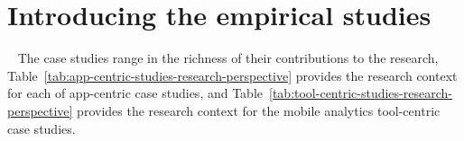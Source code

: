 

\section{Introducing the empirical studies}~\label{section-introducing-the-case-studies}
The case studies range in the richness of their contributions to the research, Table~\ref{tab:app-centric-studies-research-perspective} provides the research context for each of app-centric case studies, and Table~\ref{tab:tool-centric-studies-research-perspective} provides the research context for the mobile analytics tool-centric case studies. 


